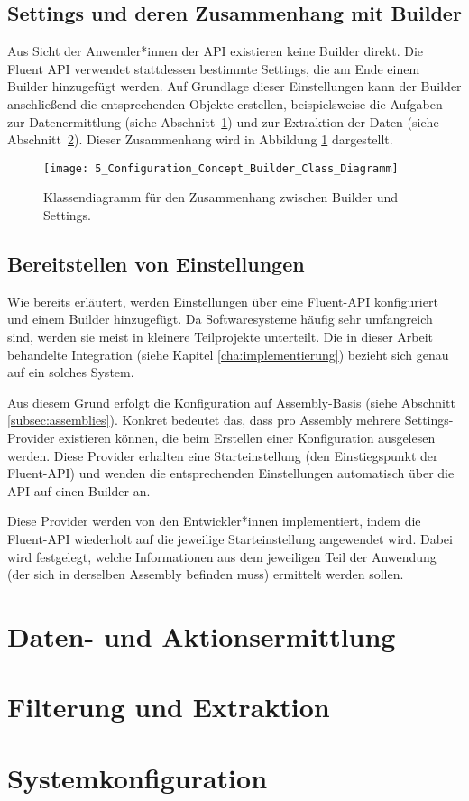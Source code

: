 \subsection{Settings und deren Zusammenhang mit Builder}
Aus Sicht der Anwender*innen der API existieren keine Builder direkt. Die Fluent API verwendet stattdessen bestimmte Settings, die am Ende einem Builder hinzugefügt werden. Auf Grundlage dieser Einstellungen kann der Builder anschließend die entsprechenden Objekte erstellen, beispielsweise die Aufgaben zur Datenermittlung (siehe Abschnitt~\ref{sec:data_collection_concept}) und zur Extraktion der Daten (siehe Abschnitt~\ref{sec:data_extraction_concept}).  
Dieser Zusammenhang wird in Abbildung \ref{fig:builder_and_settings_cooperation} dargestellt.

\begin{figure}[H]
    \centering
    \texttt{[image: 5\_Configuration\_Concept\_Builder\_Class\_Diagramm]}
    \caption{Klassendiagramm für den Zusammenhang zwischen Builder und Settings.}
    \label{fig:builder_and_settings_cooperation}
\end{figure}

\subsection{Bereitstellen von Einstellungen}
Wie bereits erläutert, werden Einstellungen über eine Fluent-API konfiguriert und einem Builder hinzugefügt. Da Softwaresysteme häufig sehr umfangreich sind, werden sie meist in kleinere Teilprojekte unterteilt. Die in dieser Arbeit behandelte Integration (siehe Kapitel \ref{cha:implementierung}) bezieht sich genau auf ein solches System.

Aus diesem Grund erfolgt die Konfiguration auf Assembly-Basis (siehe Abschnitt \ref{subsec:assemblies}). Konkret bedeutet das, dass pro Assembly mehrere Settings-Provider existieren können, die beim Erstellen einer Konfiguration ausgelesen werden. Diese Provider erhalten eine Starteinstellung (den Einstiegspunkt der Fluent-API) und wenden die entsprechenden Einstellungen automatisch über die API auf einen Builder an.

Diese Provider werden von den Entwickler*innen implementiert, indem die Fluent-API wiederholt auf die jeweilige Starteinstellung angewendet wird. Dabei wird festgelegt, welche Informationen aus dem jeweiligen Teil der Anwendung (der sich in derselben Assembly befinden muss) ermittelt werden sollen.

\section{Daten- und Aktionsermittlung}
\label{sec:data_collection_concept}

\section{Filterung und Extraktion}
\label{sec:data_extraction_concept}

\section{Systemkonfiguration}
\label{sec:integration_concept}


